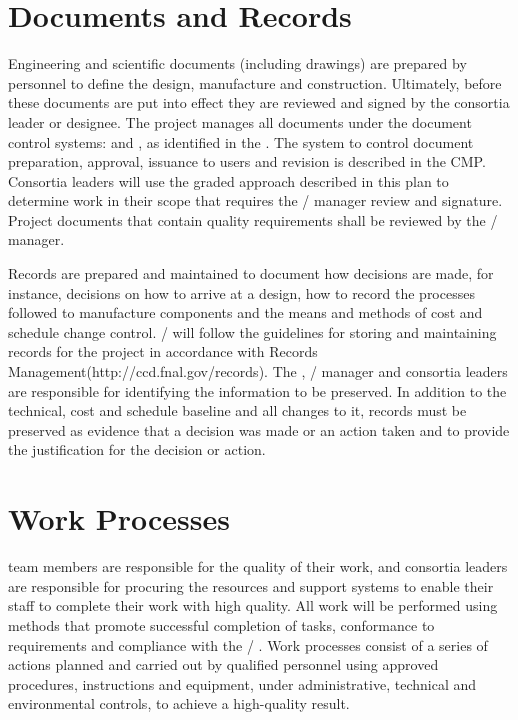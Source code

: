 \section{Documents and Records}

Engineering and scientific documents (including drawings) are prepared
by  personnel to define the design, manufacture and
construction. Ultimately, before these documents are put into effect
they are reviewed and signed by the  consortia leader or
designee. The  project manages all documents under the
document control systems:  and \docdb, as identified in the
 .  The system to control document preparation,
approval, issuance to users and revision is described in the
CMP. Consortia leaders will use the graded approach described in this
plan to determine work in their scope that requires the
/  manager review and
signature. Project documents that contain quality requirements shall
be reviewed by the /  manager.

Records are prepared and maintained to document how decisions are
made, for instance, decisions on how to arrive at a design, how to
record the processes followed to manufacture components and the means
and methods of cost and schedule change
control. / will follow the guidelines for
storing and maintaining records for the project in accordance with
\fnal Records Management(http://ccd.fnal.gov/records). The
 , / 
manager and consortia leaders are responsible for identifying the
information to be preserved. In addition to the technical, cost and
schedule baseline and all changes to it, records must be preserved as
evidence that a decision was made or an action taken and to provide
the justification for the decision or action.

\section{Work Processes}

 team members are responsible for the quality of their
work, and consortia leaders are responsible for procuring the
resources and support systems to enable their staff to complete their
work with high quality. All  work will be performed using
methods that promote successful completion of tasks, conformance to
 requirements and compliance with the
/ . Work processes consist of a
series of actions planned and carried out by qualified personnel using
approved procedures, instructions and equipment, under administrative,
technical and environmental controls, to achieve a high-quality
result.

